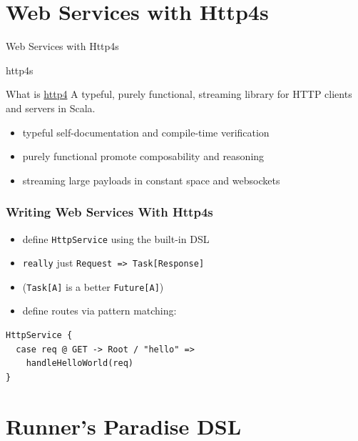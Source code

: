 \documentclass{beamer}
\begin{document}
\section{Web Services with Http4s}

\begin{frame}
  \begin{center}
    \Huge Web Services with Http4s
  \end{center}
\end{frame}

\begin{frame}{http4s}
  \begin{block}{What is \hyperlink{http://http4s.org/}{http4}}
    A typeful, purely functional, streaming library for HTTP
    clients and servers in Scala.
  \end{block}
  \begin{itemize}
  \item typeful \textemdash{} self-documentation and compile-time verification
  \item purely functional \textemdash{} promote composability and reasoning
  \item streaming \textemdash{} large payloads in constant space and websockets
  \end{itemize}
\end{frame}

\begin{frame}[fragile]
  \frametitle{Writing Web Services With Http4s}
  \begin{itemize}
  \item define \texttt{HttpService} using the built-in DSL
  \item \texttt{really} just \texttt{Request => Task[Response]}
  \item (\texttt{Task[A]} is a better \texttt{Future[A]})
  \item define routes via pattern matching:
  \end{itemize}
\begin{verbatim}
HttpService {
  case req @ GET -> Root / "hello" =>
    handleHelloWorld(req)
}
\end{verbatim}
\end{frame}

\section{Runner's Paradise DSL}
\end{document}
